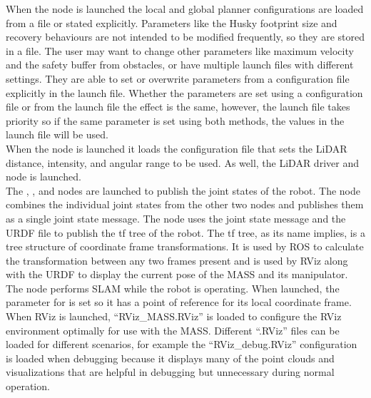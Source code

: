 When the  node is launched the local and global planner configurations are loaded from a file or stated explicitly. Parameters like the Husky footprint size and recovery behaviours are not intended to be modified frequently, so they are stored in a file. The user may want to change other parameters like maximum velocity and the safety buffer from obstacles, or have multiple launch files with different settings. They are able to set or overwrite parameters from a configuration file explicitly in the launch file. Whether the parameters are set using a configuration file or from the launch file the effect is the same, however, the launch file takes priority so if the same parameter is set using both methods, the values in the launch file will be used.\\

When the  node is launched it loads the configuration file that sets the LiDAR distance, intensity, and angular range to be used. As well, the LiDAR driver and  node is launched.\\

The , , and  nodes are launched to publish the joint states of the robot. The  node combines the individual joint states from the other two nodes and publishes them as a single joint state message. The node  uses the joint state message and the URDF file to publish the tf tree of the robot. The tf tree, as its name implies, is a tree structure of coordinate frame transformations. It is used by ROS to calculate the transformation between any two frames present and is used by RViz along with the URDF to display the current pose of the MASS and its manipulator.\\

The node  performs SLAM while the robot is operating. When launched, the parameter for  is set so it has a point of reference for its local coordinate frame.\\

When RViz is launched, ``RViz\_MASS.RViz'' is loaded to configure the RViz environment optimally for use with the MASS. Different ``.RViz'' files can be loaded for different scenarios, for example the ``RViz\_debug.RViz'' configuration is loaded when debugging because it displays many of the point clouds and visualizations that are helpful in debugging but unnecessary during normal operation.\\

